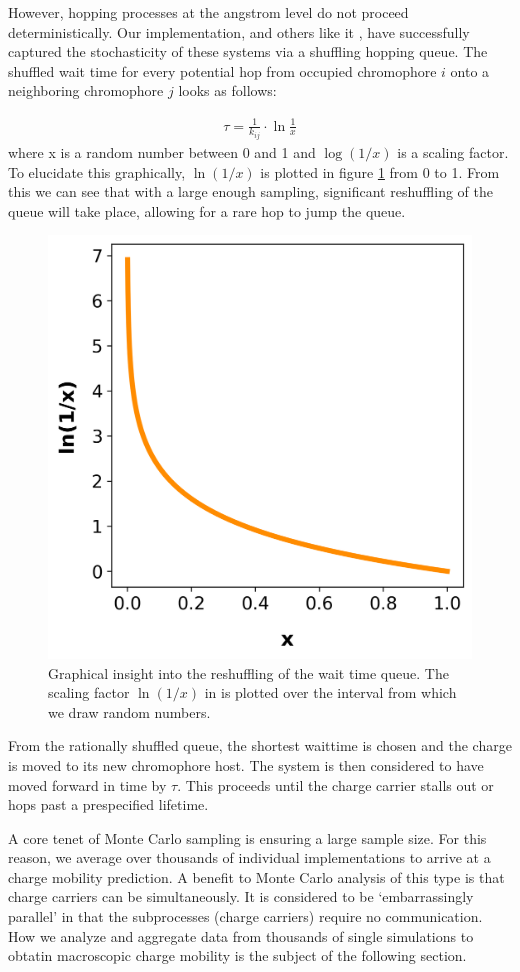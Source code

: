 However, hopping processes at the angstrom level do not proceed deterministically. 
Our implementation, and others like it \cite{Gali2017}\cite{Kaiser2018}, have
successfully captured the stochasticity of these systems via a shuffling hopping queue.
The shuffled wait time for every potential hop from occupied chromophore $i$ onto a
neighboring chromophore $j$ looks as follows:

\begin{align}
    \tau = \frac{1}{k_{ij}} \cdot \ln{\frac{1}{x}} 
    \label{waittime}
\end{align}
where x is a random number between 0 and 1 and $\log{(1/x)}$ is a scaling
factor. To elucidate this
graphically, $\ln{(1/x)}$ is plotted in figure \ref{fig:ln} from 0 to 1. From this we can see that with
a large enough sampling, significant reshuffling of the queue will take place, allowing for a rare hop to jump
the queue.

\begin{figure}
  \center
  \includegraphics[width=0.5\linewidth]{figures/naturallog.png}
  \caption{Graphical insight into the reshuffling of the wait time queue. The
    scaling factor $\ln{(1/x)}$ in \label{waittime} is plotted over the
    interval from which we draw random numbers. }
  \label{fig:ln}
\end{figure}

From the rationally shuffled queue, the shortest waittime is chosen and the charge is moved to
its new chromophore host. The system is then considered to have moved forward in time by $\tau$. This proceeds
until the charge carrier stalls out or hops past a prespecified lifetime. 


A core tenet of Monte Carlo sampling is ensuring a large sample size. For this reason, we average over
thousands of individual  implementations to arrive at a charge mobility prediction. 
A benefit to Monte Carlo analysis of this type is that charge carriers can be simultaneously. It is considered
to be `embarrassingly parallel' in that the subprocesses (charge carriers) require no communication.
How we analyze and aggregate data from thousands of
single  simulations to obtatin macroscopic charge mobility is the subject of the following section.



